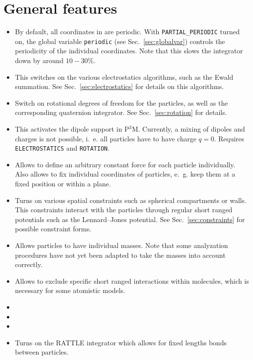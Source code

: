 \section{General features}
\begin{itemize}
\item {} By default, all coordinates in \es{} are periodic. With
  \texttt{PARTIAL\_PERIODIC} turned on, the \es{} global variable \texttt{periodic} (see
  Sec.~\ref{sec:globalvar}) controls the periodicity of the individual coordinates. Note that this
  slows the integrator down by around $10-30\%$.
\item {} This switches on the various electrostatics algorithms, such as
  the Ewald summation. See Sec.~\ref{sec:electrostatics} for details on this algorithms.
\item {} Switch on rotational degrees of freedom for the particles, as well as
  the corresponding quaternion integrator. See Sec.~\ref{sec:rotation} for details.
\item {} This activates the dipole support in P$^3$M. Currently, a mixing of
  dipoles and charges is not possible, i.~e. all particles have to have charge $q=0$.
  Requires \texttt{ELECTROSTATICS} and \texttt{ROTATION}.
\item {} Allows to define an arbitrary constant force for each particle
  individually. Also allows to fix individual coordinates of particles, e.~g. keep them at a fixed
  position or within a plane.
\item {} Turns on various spatial constraints such as spherical compartments
  or walls. This constraints interact with the particles through regular short ranged potentials
  such as the Lennard--Jones potential. See Sec.~\ref{sec:constraints} for possible constraint
  forms.
\item {} Allows particles to have individual masses. Note that some analyzation
  procedures have not yet been adapted to take the masses into account correctly.
\item {} Allows to exclude specific short ranged interactions within
  molecules, which is necessary for some atomistic models.
\item {}
\item {}
\item {}
\item {} Turns on the RATTLE integrator which allows for fixed lengths
  bonds between particles.
\end{itemize}

